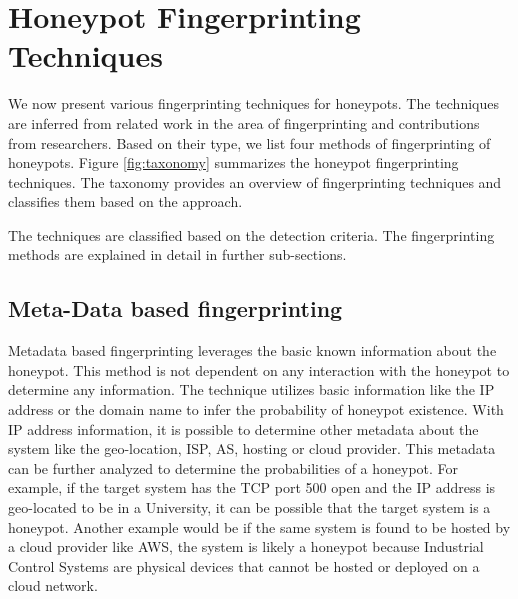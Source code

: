 \section{Honeypot Fingerprinting Techniques}
\label{sec:hft}

We now present various fingerprinting techniques for honeypots. The techniques are inferred from related work in the area of fingerprinting and contributions from researchers. Based on their type, we list four methods of fingerprinting of honeypots. Figure \ref{fig:taxonomy} summarizes the honeypot fingerprinting techniques. The taxonomy provides an overview of fingerprinting techniques and classifies them based on the approach. 

The techniques are classified based on the detection criteria. 
The fingerprinting methods are explained in detail in further sub-sections. 

\subsection{Meta-Data based fingerprinting}
Metadata based fingerprinting leverages the basic known information about the honeypot. This method is  not dependent on any interaction with the honeypot to determine any information. The technique utilizes basic information like the IP address or the domain name to infer the probability of honeypot existence. With IP address information, it is possible to determine other metadata about the system like the geo-location, ISP, AS, hosting or cloud provider. This metadata can be further analyzed to determine the probabilities of a honeypot. For example, if the target system has the TCP port 500 open and the IP address is geo-located  to be in a University, it can be possible that the target system is a honeypot. Another example would be if the same system is found to be hosted by a cloud provider like AWS, the system is likely a honeypot because Industrial Control Systems are physical devices that cannot be hosted or deployed on a cloud network.

